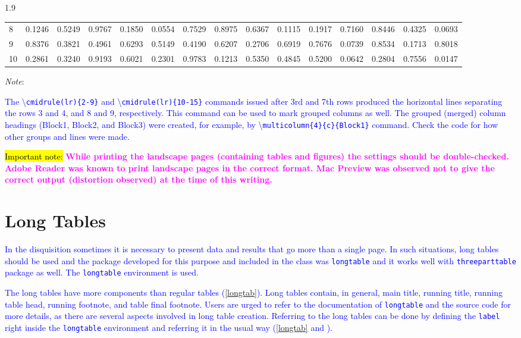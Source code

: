 \documentclass[phd]{ndsu-thesis-2022}
\newcommand\myspacing{1.9} %
\newcommand\italk[1]{\textcolor{blue}{#1}}  %
\newcommand\cmd[1]{\textbackslash\texttt{#1}}  %
\newcommand\vb[1]{\textcolor{blue}{\texttt{#1}}}%
\begin{document}
\begin{spacing}{\myspacing}
\begin{landscape}
\begin{table}[p]
{\begin{tabular}{l  rrrr  cccc  llll  rr}
8 & 0.1246 & 0.5249 & 0.9767 & 0.1850 & 0.0554 & 0.7529 & 0.8975 & 0.6367 & 0.1115 & 0.1917 & 0.7160 & 0.8446 & 0.4325 & 0.0693 \\
\cmidrule(lr){10-15}
9 & 0.8376 & 0.3821 & 0.4961 & 0.6293 & 0.5149 & 0.4190 & 0.6207 & 0.2706 & 0.6919 & 0.7676 & 0.0739 & 0.8534 & 0.1713 & 0.8018 \\
10 & 0.2861 & 0.3240 & 0.9193 & 0.6021 & 0.2301 & 0.9783 & 0.1213 & 0.5350 & 0.4845 & 0.5200 & 0.0642 & 0.2804 & 0.7556 & 0.0147 \\
\bottomrule
\end{tabular}
}    
\begin{tablenotes}[flushleft]
\footnotesize
\item \hspace{-1ex} \emph{Note}: \italk{The \cmd{cmidrule(lr)\{2-9\}} and \cmd{cmidrule(lr)\{10-15\}} commands issued after 3rd and 7th rows produced the horizontal lines separating the rows 3 and 4, and 8 and 9, respectively. This command can be used to mark grouped columns as well. The grouped (merged) column headings (Block1, Block2, and Block3) were created, for example, by \cmd{multicolumn\{4\}\{c\}\{Block1\}} command. Check the code for how other groups and lines were made.
\item \vspace{4ex}
\italk{\hl{Important note:}} \textcolor{magenta}{\bfseries While printing the landscape pages (containing tables and figures) the settings should be double-checked. Adobe Reader was known to print landscape pages in the correct format. Mac Preview was observed not to give the correct output (distortion observed) at the time of this writing.}
}  
\end{tablenotes}  
\label{tab210}
\end{table}
\end{landscape}

\section{Long Tables}
\italk{In the disquisition sometimes it is necessary to present data and results that go more than a single page. In such situations, long tables should be used and the package developed for this purpose and included in the class was 
\vb{longtable} and it works well with \vb{threeparttable} package as well. The \vb{longtable} environment is used.} 

\italk{The long tables have more components than regular tables (\cref{longtab}). Long tables contain, in general, main title, running title, running table head, running footnote, and table final footnote. Users are urged to refer to the documentation of \vb{longtable} and the source code for more details, as there are several aspects involved in long table creation. Referring to the long tables can be done by defining the \texttt{label} right inside the \texttt{longtable} environment and referring it in the usual way (\cref{longtab} and \Cref{longtab}).}


\end{spacing}
\end{document}
